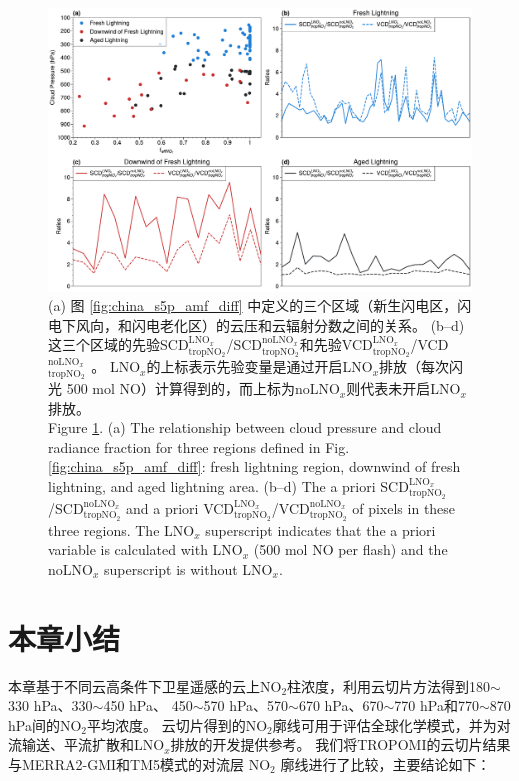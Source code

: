 \begin{figure}[!htbp]
    \centering
    \includegraphics[width=14cm]{./figures/china_amf_contribution.pdf}
    \caption{
    (a) 图 \ref{fig:china_s5p_amf_diff} 中定义的三个区域（新生闪电区，闪电下风向，和闪电老化区）的云压和云辐射分数之间的关系。
     (b--d) 这三个区域的先验SCD$^{\textrm{LNO$_x$}}_{\textrm{tropNO$_2$}}$/SCD$^{\textrm{noLNO$_x$}}_{ \textrm{tropNO$_2$}}$和先验VCD$^{\textrm{LNO$_x$}}_{\textrm{tropNO$_2$}}$/VCD$^{\textrm{noLNO$_x$ }}_{\textrm{tropNO$_2$}}$。
     LNO$_x$的上标表示先验变量是通过开启LNO$_x$排放（每次闪光 500 mol NO）计算得到的，而上标为noLNO$_x$则代表未开启LNO$_x$排放。\\
     Figure \ref{fig:china_amf_contribution}. (a) The relationship between cloud pressure and cloud radiance fraction for three regions defined in Fig. \ref{fig:china_s5p_amf_diff}: fresh lightning region, downwind of fresh lightning, and aged lightning area.
    (b--d) The a priori SCD$^{\textrm{LNO$_x$}}_{\textrm{tropNO$_2$}}$/SCD$^{\textrm{noLNO$_x$}}_{\textrm{tropNO$_2$}}$ and a priori VCD$^{\textrm{LNO$_x$}}_{\textrm{tropNO$_2$}}$/VCD$^{\textrm{noLNO$_x$}}_{\textrm{tropNO$_2$}}$ of pixels in these three regions. The LNO$_x$ superscript indicates that the a priori variable is calculated with LNO$_x$ (500 mol NO per flash) and the noLNO$_x$ superscript is without LNO$_x$.
    }
    \label{fig:china_amf_contribution}
\end{figure}


\section{本章小结}

本章基于不同云高条件下卫星遥感的云上NO$_2$柱浓度，利用云切片方法得到180$\sim$330 hPa、330$\sim$450 hPa、
450$\sim$570 hPa、570$\sim$670 hPa、670$\sim$770 hPa和770$\sim$870 hPa间的NO$_2$平均浓度。
云切片得到的NO$_2$廓线可用于评估全球化学模式，并为对流输送、平流扩散和LNO$_x$排放的开发提供参考。
我们将TROPOMI的云切片结果与MERRA2-GMI和TM5模式的对流层 NO$_2$ 廓线进行了比较，主要结论如下：

